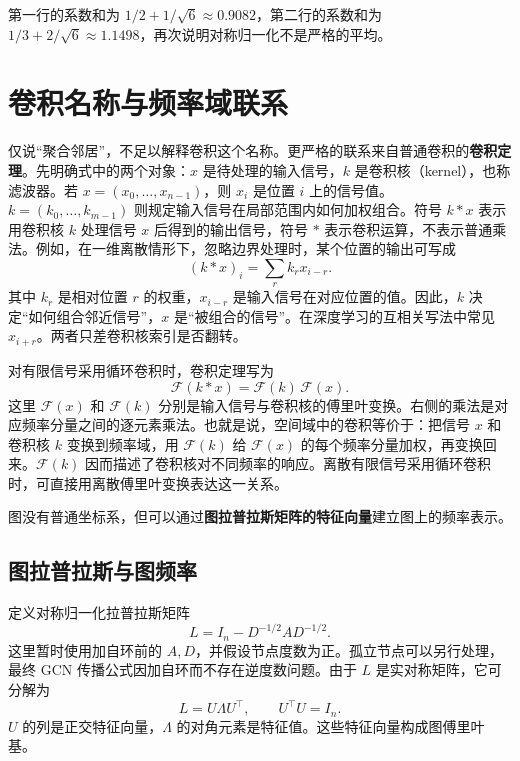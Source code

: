 \documentclass[UTF8,a4paper,11pt,fontset=fandol]{ctexart}
\begin{document}
第一行的系数和为 $1/2+1/\sqrt6\approx0.9082$，第二行的系数和为 $1/3+2/\sqrt6\approx1.1498$，再次说明对称归一化不是严格的平均。

\section{卷积名称与频率域联系}
仅说“聚合邻居”，不足以解释卷积这个名称。更严格的联系来自普通卷积的\textbf{卷积定理}。先明确式中的两个对象：$x$ 是待处理的输入信号，$k$ 是卷积核（kernel），也称滤波器。若 $x=(x_0,\ldots,x_{n-1})$，则 $x_i$ 是位置 $i$ 上的信号值。$k=(k_0,\ldots,k_{m-1})$ 则规定输入信号在局部范围内如何加权组合。符号 $k*x$ 表示用卷积核 $k$ 处理信号 $x$ 后得到的输出信号，符号 $*$ 表示卷积运算，不表示普通乘法。例如，在一维离散情形下，忽略边界处理时，某个位置的输出可写成
\begin{equation}
(k*x)_i=\sum_r k_r x_{i-r}.
\end{equation}
其中 $k_r$ 是相对位置 $r$ 的权重，$x_{i-r}$ 是输入信号在对应位置的值。因此，$k$ 决定“如何组合邻近信号”，$x$ 是“被组合的信号”。在深度学习的互相关写法中常见 $x_{i+r}$。两者只差卷积核索引是否翻转。

对有限信号采用循环卷积时，卷积定理写为
\begin{equation}
\mathcal F(k*x)=\mathcal F(k)\,\mathcal F(x).
\end{equation}
这里 $\mathcal F(x)$ 和 $\mathcal F(k)$ 分别是输入信号与卷积核的傅里叶变换。右侧的乘法是对应频率分量之间的逐元素乘法。也就是说，空间域中的卷积等价于：把信号 $x$ 和卷积核 $k$ 变换到频率域，用 $\mathcal F(k)$ 给 $\mathcal F(x)$ 的每个频率分量加权，再变换回来。$\mathcal F(k)$ 因而描述了卷积核对不同频率的响应。离散有限信号采用循环卷积时，可直接用离散傅里叶变换表达这一关系。

图没有普通坐标系，但可以通过\textbf{图拉普拉斯矩阵的特征向量}建立图上的频率表示。

\subsection{图拉普拉斯与图频率}
定义对称归一化拉普拉斯矩阵
\begin{equation}
L=I_n-D^{-1/2}AD^{-1/2}.
\label{eq:laplacian}
\end{equation}
这里暂时使用加自环前的 $A,D$，并假设节点度数为正。孤立节点可以另行处理，最终 GCN 传播公式因加自环而不存在逆度数问题。由于 $L$ 是实对称矩阵，它可分解为
\begin{equation}
L=U\Lambda U^\top,
\qquad U^\top U=I_n.
\end{equation}
$U$ 的列是正交特征向量，$\Lambda$ 的对角元素是特征值。这些特征向量构成图傅里叶基。
\end{document}
